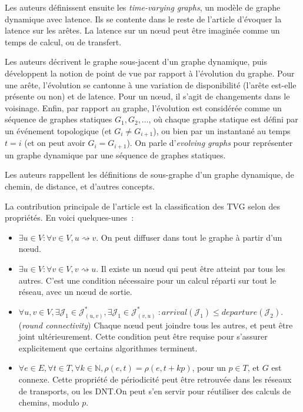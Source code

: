 \documentclass[12pt,a4paper]{article}
\begin{document}
Les auteurs définissent ensuite les \textit{time-varying graphs}, un
modèle de graphe dynamique avec latence. Ils se contente dans le reste
de l'article d'évoquer la latence sur les arêtes. La latence sur un
nœud peut être imaginée comme un temps de calcul, ou de transfert.

Les auteurs décrivent le graphe sous-jacent d'un graphe dynamique,
puis développent la notion de point de vue par rapport à l'évolution
du graphe. Pour une arête, l'évolution se cantonne à une variation de
disponibilité (l'arête est-elle présente ou non) et de latence. Pour
un nœud, il s'agit de changements dans le voisinage. Enfin, par
rapport au graphe, l'évolution est considérée comme un séquence de
graphes statiques \(G_1, G_2, \dots\), où chaque graphe statique est
défini par un événement topologique (et \(G_i \neq G_{i+1}\)), ou bien
par un instantané au temps \(t = i\) (et on peut avoir
\(G_i = G_{i+1}\)). On parle d'\textit{evolving graphs} pour
représenter un graphe dynamique par une séquence de graphes statiques.

Les auteurs rappellent les définitions de sous-graphe d'un graphe
dynamique, de chemin, de distance, et d'autres concepts.

La contribution principale de l'article est la classification des TVG
selon des propriétés. En voici quelques-unes~:

\begin{itemize}
\item \(\exists u \in V : \forall v \in V, u \rightsquigarrow v\). On
  peut diffuser dans tout le graphe à partir d'un nœud.
\item \(\exists u \in V : \forall v \in V, v \rightsquigarrow u\). Il
  existe un nœud qui peut être atteint par tous les autres. C'est une
  condition nécessaire pour un calcul réparti sur tout le réseau, avec
  un nœud de sortie.
\item
  \(\forall u, v \in V, \exists \mathcal{J}_1 \in
  \mathcal{J}^*_{(u,v)}, \exists \mathcal{J}_1 \in
  \mathcal{J}^*_{(v,u)}~: arrival(\mathcal{J}_1) \leq
  departure(\mathcal{J}_2)\). (\textit{round connectivity}) Chaque
  nœud peut joindre tous les autres, et peut être joint
  ultérieurement. Cette condition peut être requise pour s'assurer
  explicitement que certains algorithmes terminent.
\item
  \(\forall e \in E, \forall t \in T, \forall k \in \mathbb{N},
  \rho(e, t) = \rho(e, t + kp)\), pour un \(p \in T\), et \(G\) est
  connexe. Cette propriété de périodicité peut être retrouvée dans les
  réseaux de transports, ou les DNT.\@ On peut s'en servir pour
  réutiliser des calculs de chemins, modulo \(p\).
\end{itemize}
\end{document}
